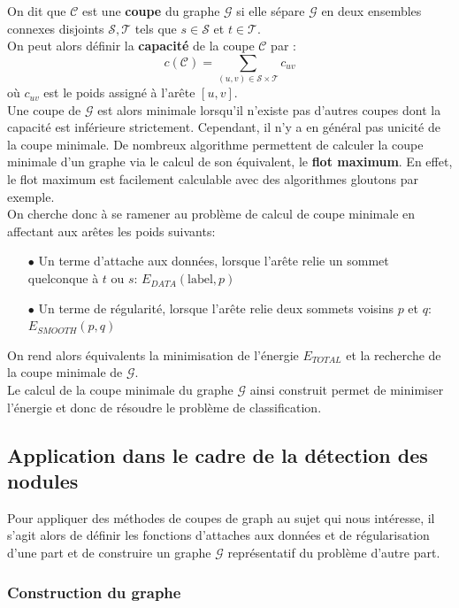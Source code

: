 \documentclass{article}
\newcommand{\G}{\mathcal{G}}
\newcommand{\lab}{\text{label}}
\begin{document}
On dit que $\mathcal{C}$ est une \textbf{coupe} du graphe $\G$ si elle sépare $\G$ en deux ensembles connexes disjoints $\mathcal{S},\mathcal{T}$ tels que  
$s \in \mathcal{S}$ et $t \in \mathcal{T}$.\\
On peut alors définir la \textbf{capacité} de la coupe $\mathcal{C}$ par :
\[
	c(\mathcal{C}) = \sum_{(u,v) \in \mathcal{S} \times \mathcal{T}} c_{uv}
\]
où $c_{uv}$ est le poids assigné à l'arête $[u,v]$.\\
Une coupe de $\G$ est alors minimale lorsqu'il n'existe pas d'autres coupes dont la capacité est inférieure strictement. Cependant, il n'y a en général pas unicité de la coupe minimale. De nombreux algorithme permettent de calculer la coupe minimale d'un graphe via le calcul de son équivalent, le \textbf{flot maximum}. En effet, le flot maximum est facilement calculable avec des algorithmes gloutons par exemple. \\
On cherche donc à se ramener au problème de calcul de coupe minimale en affectant aux arêtes les poids suivants:
\begin{itemize}
	\item[$\bullet$] Un terme d'attache aux données, lorsque l'arête relie un sommet quelconque à $t$ ou $s$: $E_{DATA}(\lab, p)$
	\item[$\bullet$] Un terme de régularité, lorsque l'arête relie deux sommets voisins $p$ et $q$: $E_{SMOOTH}(p,q)$
\end{itemize}
On rend alors équivalents la minimisation de l'énergie $E_{TOTAL}$ et la recherche de la coupe minimale de $\G$.\\
Le calcul de la coupe minimale du graphe $\G$ ainsi construit permet de minimiser l'énergie et donc de résoudre le problème de classification.

\subsection{Application dans le cadre de la détection des nodules}

Pour appliquer des méthodes de coupes de graph au sujet qui nous intéresse, il s'agit alors de définir les fonctions d'attaches aux données et de régularisation d'une part et de construire un graphe $\G$ représentatif du problème d'autre part.

\subsubsection{Construction du graphe}
\end{document}
